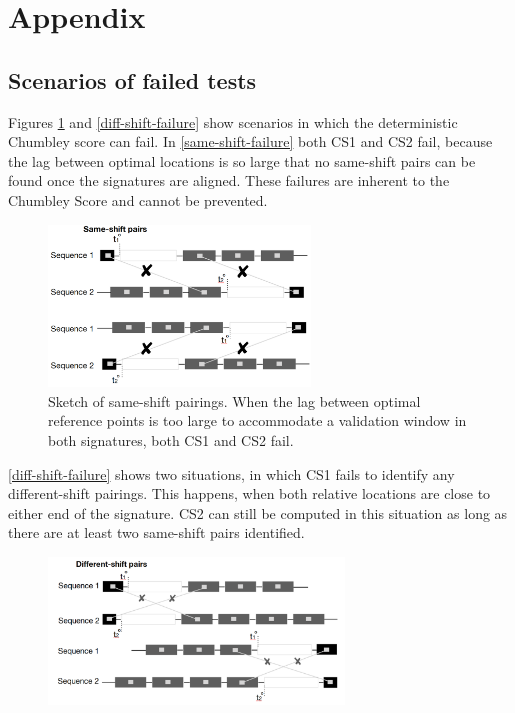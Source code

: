 \documentclass[12pt]{article}
\begin{document}
\section*{Appendix}\label{appendix}

\begin{appendix}

\section{Scenarios of failed tests}
\label{appendix:appxfailed}
Figures \ref{same-shift-failure} and \ref{diff-shift-failure} show scenarios in which the deterministic Chumbley score can fail. 
In \autoref{same-shift-failure} both CS1 and CS2 fail, because the lag between optimal locations is so large that no same-shift pairs can be found once the signatures are aligned. These failures are inherent to the Chumbley Score and cannot be prevented.
\begin{figure}[hbtp]
\centering
\includegraphics[width=0.62\textwidth]{images/same-shift-failure.png}

\caption{\label{same-shift-failure}Sketch of same-shift pairings. When the lag between optimal reference points is too large to accommodate a validation window in both signatures, both CS1 and CS2 fail.}
\end{figure}

\autoref{diff-shift-failure} shows two situations, in which CS1 fails to identify any different-shift pairings. This happens, when both relative locations are close to either end of the signature. CS2 can still be computed in this situation as long as there are at least two same-shift pairs identified. 

\begin{figure}[hbtp]
\centering
\includegraphics[width=0.7\textwidth]{images/diff-shift-failure.png}


\end{figure}
\end{appendix}
\end{document}
